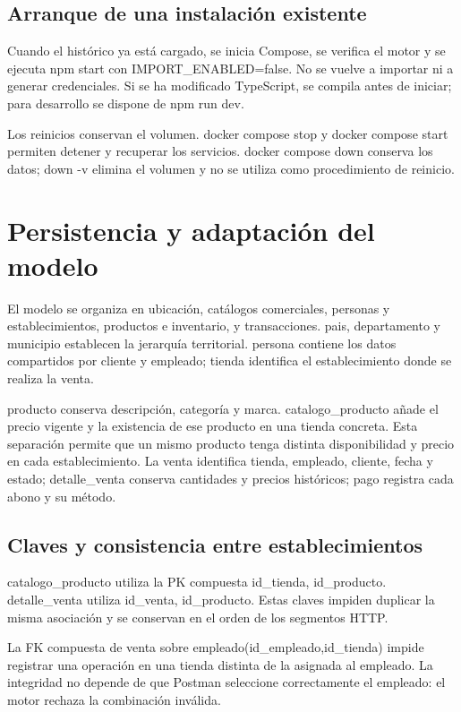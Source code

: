 \documentclass[10pt,letterpaper]{article}
\begin{document}
\subsection{Arranque de una instalación existente}
Cuando el histórico ya está cargado, se inicia Compose, se verifica el motor y se ejecuta npm start con IMPORT\_ENABLED=false. No se vuelve a importar ni a generar credenciales. Si se ha modificado TypeScript, se compila antes de iniciar; para desarrollo se dispone de npm run dev.

Los reinicios conservan el volumen. docker compose stop y docker compose start permiten detener y recuperar los servicios. docker compose down conserva los datos; down -v elimina el volumen y no se utiliza como procedimiento de reinicio.

\section{Persistencia y adaptación del modelo}
El modelo se organiza en ubicación, catálogos comerciales, personas y establecimientos, productos e inventario, y transacciones. pais, departamento y municipio establecen la jerarquía territorial. persona contiene los datos compartidos por cliente y empleado; tienda identifica el establecimiento donde se realiza la venta.

producto conserva descripción, categoría y marca. catalogo\_producto añade el precio vigente y la existencia de ese producto en una tienda concreta. Esta separación permite que un mismo producto tenga distinta disponibilidad y precio en cada establecimiento. La venta identifica tienda, empleado, cliente, fecha y estado; detalle\_venta conserva cantidades y precios históricos; pago registra cada abono y su método.

\subsection{Claves y consistencia entre establecimientos}
catalogo\_producto utiliza la PK compuesta id\_tienda, id\_producto. detalle\_venta utiliza id\_venta, id\_producto. Estas claves impiden duplicar la misma asociación y se conservan en el orden de los segmentos HTTP.

La FK compuesta de venta sobre empleado(id\_empleado,id\_tienda) impide registrar una operación en una tienda distinta de la asignada al empleado. La integridad no depende de que Postman seleccione correctamente el empleado: el motor rechaza la combinación inválida.
\end{document}
